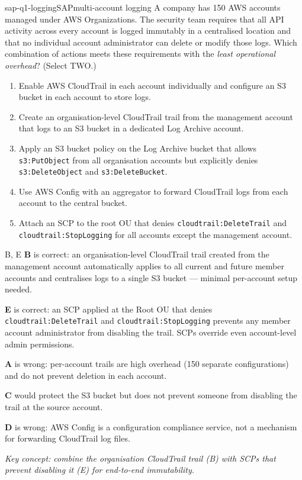 \begin{question}{sap-q1-logging}{SAP}{multi-account logging}
A company has 150 AWS accounts managed under AWS Organizations. The security team requires that all API activity across every account is logged immutably in a centralised location and that no individual account administrator can delete or modify those logs. Which combination of actions meets these requirements with the \emph{least operational overhead}? (Select TWO.)

\begin{enumerate}[label=\Alph*.]
  \item Enable AWS CloudTrail in each account individually and configure an S3 bucket in each account to store logs.
  \item Create an organisation-level CloudTrail trail from the management account that logs to an S3 bucket in a dedicated Log Archive account.
  \item Apply an S3 bucket policy on the Log Archive bucket that allows \texttt{s3:PutObject} from all organisation accounts but explicitly denies \texttt{s3:DeleteObject} and \texttt{s3:DeleteBucket}.
  \item Use AWS Config with an aggregator to forward CloudTrail logs from each account to the central bucket.
  \item Attach an SCP to the root OU that denies \texttt{cloudtrail:DeleteTrail} and \texttt{cloudtrail:StopLogging} for all accounts except the management account.
\end{enumerate}
\end{question}

\begin{answer}{B, E}
\textbf{B} is correct: an organisation-level CloudTrail trail created from the management account automatically applies to all current and future member accounts and centralises logs to a single S3 bucket --- minimal per-account setup needed.

\textbf{E} is correct: an SCP applied at the Root OU that denies \texttt{cloudtrail:DeleteTrail} and \texttt{cloudtrail:StopLogging} prevents any member account administrator from disabling the trail. SCPs override even account-level admin permissions.

\textbf{A} is wrong: per-account trails are high overhead (150 separate configurations) and do not prevent deletion in each account.

\textbf{C} would protect the S3 bucket but does not prevent someone from disabling the trail at the source account.

\textbf{D} is wrong: AWS Config is a configuration compliance service, not a mechanism for forwarding CloudTrail log files.

\textit{Key concept: combine the organisation CloudTrail trail (B) with SCPs that prevent disabling it (E) for end-to-end immutability.}
\end{answer}

